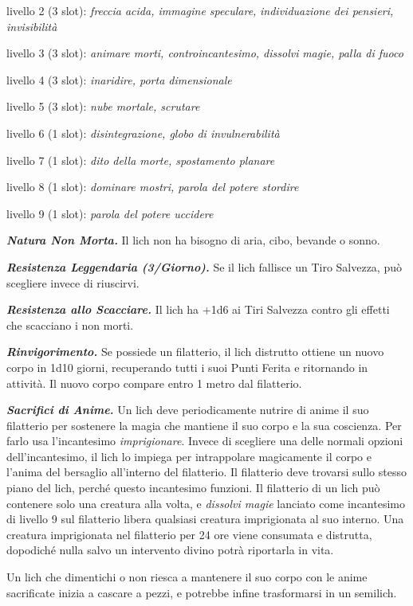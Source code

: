 \begin{multicols}{2}
livello 2 (3 slot): \textit{freccia acida, immagine speculare,} \textit{individuazione dei pensieri, invisibilità}

livello 3 (3 slot): \textit{animare morti, controincantesimo, dissolvi} \textit{magie, palla di fuoco}

livello 4 (3 slot): \textit{inaridire, porta dimensionale}

livello 5 (3 slot): \textit{nube mortale, scrutare}

livello 6 (1 slot): \textit{disintegrazione, globo di invulnerabilità}

livello 7 (1 slot): \textit{dito della morte, spostamento planare}

livello 8 (1 slot): \textit{dominare mostri, parola del potere stordire}

livello 9 (1 slot): \textit{parola del potere uccidere}

\textit{\textbf{Natura Non Morta.}} Il lich non ha bisogno di aria, cibo, bevande o sonno.

\textit{\textbf{Resistenza Leggendaria (3/Giorno).}} Se il lich fallisce un Tiro Salvezza, può scegliere invece di riuscirvi.

\textit{\textbf{Resistenza allo Scacciare.}} Il lich ha +1d6 ai Tiri Salvezza contro gli effetti che scacciano i non morti.

\textit{\textbf{Rinvigorimento.}} Se possiede un filatterio, il lich distrutto ottiene un nuovo corpo in 1d10 giorni, recuperando tutti i suoi Punti Ferita e ritornando in attività. Il nuovo corpo compare entro 1 metro dal filatterio.

\textit{\textbf{Sacrifici di Anime.}} Un lich deve periodicamente nutrire di anime il suo filatterio per sostenere la magia che mantiene il suo corpo e la sua coscienza. Per farlo usa l'incantesimo \textit{imprigionare}. Invece di scegliere una delle normali opzioni dell'incantesimo, il lich lo impiega per intrappolare magicamente il corpo e l'anima del bersaglio all'interno del filatterio. Il filatterio deve trovarsi sullo stesso piano del lich, perché questo incantesimo funzioni. Il filatterio di un lich può contenere solo una creatura alla volta, e \textit{dissolvi magie} lanciato come incantesimo di livello 9 sul filatterio libera qualsiasi creatura imprigionata al suo interno. Una creatura imprigionata nel filatterio per 24 ore viene consumata e distrutta, dopodiché nulla salvo un intervento divino potrà riportarla in vita.

Un lich che dimentichi o non riesca a mantenere il suo corpo con le anime sacrificate inizia a cascare a pezzi, e potrebbe infine trasformarsi in un semilich.


\end{multicols}
